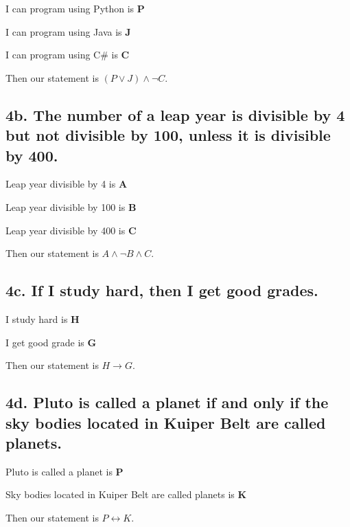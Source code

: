 \documentclass{article}
\begin{document}
I can program using Python is \textbf{P}

I can program using Java is \textbf{J}

I can program using C\# is \textbf{C}

Then our statement is $(P \lor J) \land \neg C$.

\subsection*{4b. The number of a leap year is divisible by 4 but not divisible by 100, unless it is divisible by 400.}

Leap year divisible by 4 is \textbf{A}

Leap year divisible by 100 is \textbf{B}

Leap year divisible by 400 is \textbf{C}

Then our statement is $A \land \neg B \land C$.

\subsection*{4c. If I study hard, then I get good grades.}

I study hard is \textbf{H}

I get good grade is \textbf{G}

Then our statement is $H \rightarrow G$.

\subsection*{4d. Pluto is called a planet if and only if the sky bodies located in Kuiper Belt are called planets.}

Pluto is called a planet is \textbf{P}

Sky bodies located in Kuiper Belt are called planets is \textbf{K}

Then our statement is $P \leftrightarrow K$.
\end{document}
